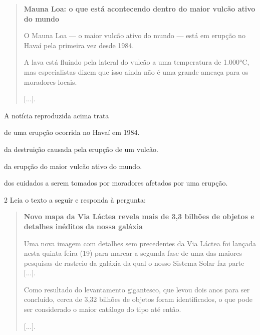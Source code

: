 \begin{quote}
\textbf{Mauna Loa: o que está acontecendo dentro do maior vulcão ativo do mundo}

O Mauna Loa --- o maior vulcão ativo do mundo --- está em erupção no
Havaí pela primeira vez desde 1984.

A lava está fluindo pela lateral do vulcão a uma temperatura de 1.000°C,
mas especialistas dizem que isso ainda não é uma grande ameaça para os
moradores locais.

{[}...{]}.
\end{quote}

A notícia reproduzida acima trata

\begin{escolha}
\item de uma erupção ocorrida no Havaí em 1984.

\item da destruição causada pela erupção de um vulcão.

\item da erupção do maior vulcão ativo do mundo.

\item dos cuidados a serem tomados por moradores afetados por uma erupção.
\end{escolha}


\num{2} Leia o texto a seguir e responda à pergunta:

\begin{quote}
\textbf{Novo mapa da Via Láctea revela mais de 3,3 bilhões de objetos e
detalhes inéditos da nossa galáxia}

Uma nova imagem com detalhes sem precedentes da Via Láctea foi lançada
nesta quinta-feira (19) para marcar a segunda fase de uma das maiores
pesquisas de rastreio da galáxia da qual o nosso Sistema Solar faz parte
{[}...{]}.

Como resultado do levantamento gigantesco, que levou dois anos para ser
concluído, cerca de 3,32 bilhões de objetos foram identificados, o que
pode ser considerado o maior catálogo do tipo até então.

{[}...{]}.
\end{quote}

